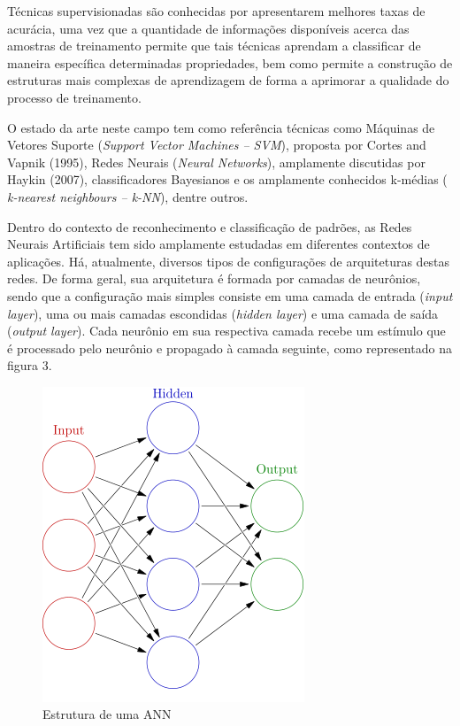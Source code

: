 Técnicas supervisionadas são conhecidas por apresentarem melhores taxas de acurácia, uma vez que a quantidade de informações disponíveis acerca das amostras de treinamento permite que tais técnicas aprendam a classificar de maneira específica determinadas propriedades, bem como permite a construção de estruturas mais complexas de aprendizagem de forma a aprimorar a qualidade do processo de treinamento.

O estado da arte neste campo tem como referência técnicas como Máquinas de Vetores Suporte (\textit{Support Vector Machines – SVM}), proposta por Cortes and Vapnik (1995), Redes Neurais (\textit{Neural Networks}), amplamente discutidas por Haykin (2007), classificadores Bayesianos e os amplamente conhecidos k-médias ( \textit{k-nearest neighbours – k-NN}), dentre outros\cite{Duda:00}. 

Dentro do contexto de reconhecimento e classificação de padrões, as Redes Neurais Artificiais tem sido amplamente estudadas em diferentes contextos de aplicações. Há, atualmente, diversos tipos de configurações de arquiteturas destas redes. De forma geral, sua arquitetura é formada por camadas de neurônios, sendo que a configuração mais simples consiste em uma camada de entrada (\textit{input layer}), uma ou mais camadas escondidas (\textit{hidden layer}) e uma camada de saída (\textit{output layer}). Cada neurônio em sua respectiva camada recebe um estímulo que é processado pelo neurônio e propagado à camada seguinte, como representado na figura 3. 
\begin{figure}[ht!]
	\caption{Estrutura de uma ANN}
	\label{fig:ann-arq}
	\begin{center}
		\includegraphics[scale=0.48]{img/ann-arq.png}
	\end{center}
\end{figure}

